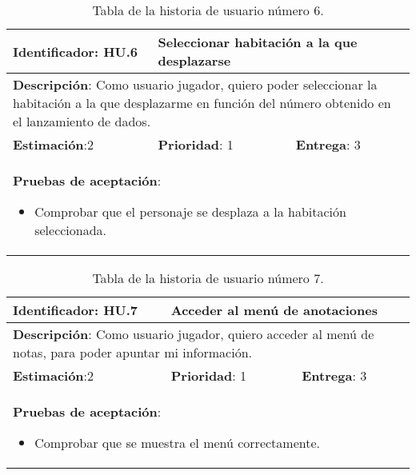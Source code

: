 \begin{table}[h]
  \begin{center}
    \begin{tabular}{|p{4cm}|p{4cm}|p{4cm}|}

    \hline
    \textbf{Identificador}: HU.6
    & \multicolumn{2}{p{8cm}|}{Seleccionar habitación a la que desplazarse}\\

    \hline
    \multicolumn{3}{|p{12cm}|}{\textbf{Descripción}: Como usuario jugador, quiero poder seleccionar la habitación a la que desplazarme en función del número obtenido en el lanzamiento de dados.}\\

    \hline
    \textbf{Estimación}:2
    & \textbf{Prioridad}: 1
    & \textbf{Entrega}: 3\\

    \hline
    \multicolumn{3}{|p{12cm}|}{\textbf{Pruebas de aceptación}:
      \begin{itemize}
        \item Comprobar que el personaje se desplaza a la habitación seleccionada.
      \end{itemize}
    }\\

    \hline

    \end{tabular}

    \caption{Tabla de la historia de usuario número 6.}
    \label{tabla-hu6}

  \end{center}
\end{table}

\begin{table}[h]
  \begin{center}
    \begin{tabular}{|p{4cm}|p{4cm}|p{4cm}|}

    \hline
    \textbf{Identificador}: HU.7
    & \multicolumn{2}{p{8cm}|}{Acceder al menú de anotaciones}\\

    \hline
    \multicolumn{3}{|p{12cm}|}{\textbf{Descripción}: Como usuario jugador, quiero acceder al menú de notas, para poder apuntar mi información.}\\

    \hline
    \textbf{Estimación}:2
    & \textbf{Prioridad}: 1
    & \textbf{Entrega}: 3\\

    \hline
    \multicolumn{3}{|p{12cm}|}{\textbf{Pruebas de aceptación}:
      \begin{itemize}
        \item Comprobar que se muestra el menú correctamente.
      \end{itemize}
    }\\

    \hline

    \end{tabular}

    \caption{Tabla de la historia de usuario número 7.}
    \label{tabla-hu7}

  \end{center}
\end{table}

